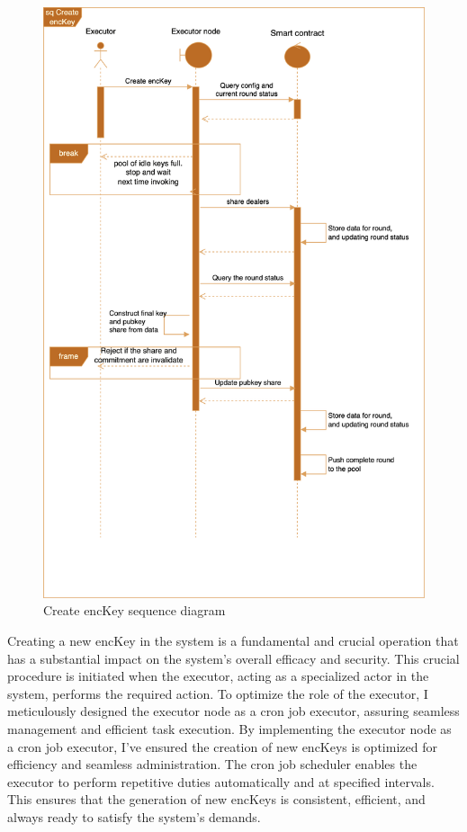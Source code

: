 \documentclass[../Main.tex]{subfiles}
\begin{document}
\begin{figure}[H]
 \centering
 \includegraphics[scale=0.14]{Figure/create-encKey-sequence-diagram.png}
 \caption{Create encKey sequence diagram}
    \label{fig:create-encKey-sequence-diagram}
\end{figure}
Creating a new encKey in the system is a fundamental and crucial operation that has a substantial impact on the system's overall efficacy and security. This crucial procedure is initiated when the executor, acting as a specialized actor in the system, performs the required action. To optimize the role of the executor, I meticulously designed the executor node as a cron job executor, assuring seamless management and efficient task execution. By implementing the executor node as a cron job executor, I've ensured the creation of new encKeys is optimized for efficiency and seamless administration. The cron job scheduler enables the executor to perform repetitive duties automatically and at specified intervals. This ensures that the generation of new encKeys is consistent, efficient, and always ready to satisfy the system's demands.
\end{document}
